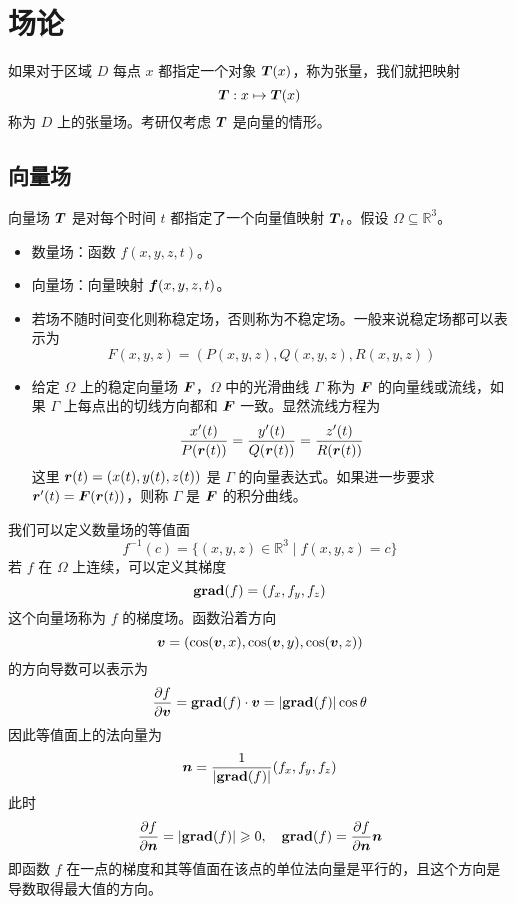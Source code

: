 \section{场论}

如果对于区域 $D$ 每点 $x$ 都指定一个对象 $\boldsymbol{T}(x)$，称为张量，我们就把映射
\[ \boldsymbol{T} : x \mapsto \boldsymbol{T}(x) \]
称为 $D$ 上的张量场。考研仅考虑 $\boldsymbol{T}$ 是向量的情形。


\subsection{向量场}

\newcommand{\grad}{\operatorname{grad}}

向量场 $\boldsymbol{T}$ 是对每个时间 $t$ 都指定了一个向量值映射 $\boldsymbol{T}_t$。假设 $\Omega \subseteq \mathbb{R}^3$。

\begin{itemize}
	\item 数量场：函数 $f(x, y, z, t)$。
	\item 向量场：向量映射 $\boldsymbol{f}(x, y, z, t)$。
	\item 若场不随时间变化则称稳定场，否则称为不稳定场。一般来说稳定场都可以表示为
	      \[ F(x, y, z) = (P(x,y,z), Q(x, y, z), R(x, y, z)) \]
	\item 给定 $\Omega$ 上的稳定向量场 $\boldsymbol{F}$，$\Omega$ 中的光滑曲线 $\Gamma$ 称为 $\boldsymbol{F}$ 的向量线或流线，如果 $\Gamma$ 上每点出的切线方向都和 $\boldsymbol{F}$ 一致。显然流线方程为
	      \[ \frac{x'(t)}{P(\boldsymbol{r}(t))} = \frac{y'(t)}{Q(\boldsymbol{r}(t))} = \frac{z'(t)}{R(\boldsymbol{r}(t))} \]
	      这里 $\boldsymbol{r}(t) = (x(t), y(t), z(t))$ 是 $\Gamma$ 的向量表达式。如果进一步要求 $\boldsymbol{r}'(t) = \boldsymbol{F}(\boldsymbol{r}(t))$，则称 $\Gamma$ 是 $\boldsymbol{F}$ 的积分曲线。
\end{itemize}

我们可以定义数量场的等值面
\[ f^{-1}(c) = \{(x, y, z) \in \mathbb{R}^3 \mid f(x, y, z) = c \} \]
若 $f$ 在 $\Omega$ 上连续，可以定义其梯度
\[ \vbf{\grad}(f) = (f_x, f_y, f_z) \]
这个向量场称为 $f$ 的梯度场。函数沿着方向
\[ \boldsymbol{v} = (\cos(\boldsymbol{v}, x), \cos(\boldsymbol{v}, y), \cos(\boldsymbol{v}, z)) \]
的方向导数可以表示为
\[ \frac{\partial f}{\partial \vbf{v}} = \vbf{\grad}(f) \cdot \vbf{v} = |\vbf{\grad}(f)| \cos \theta \]
因此等值面上的法向量为
\[ \vbf{n} = \frac{1}{|\vbf{\grad}(f)|}(f_x, f_y, f_z) \]
此时
\[ \frac{\partial f}{\partial \vbf{n}} = |\vbf{\grad}(f)| \geqslant 0, \quad \vbf{\grad}(f) = \frac{\partial f}{\partial \vbf{n}} \vbf{n} \]
即函数 $f$ 在一点的梯度和其等值面在该点的单位法向量是平行的，且这个方向是导数取得最大值的方向。

